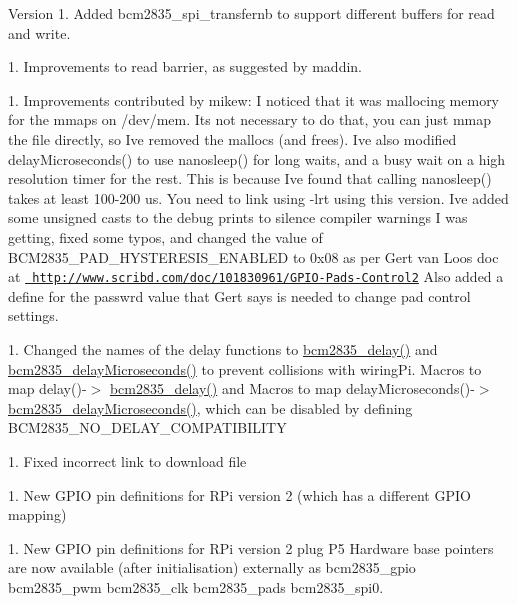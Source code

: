 \begin{DoxyVersion}{Version}
1. Added bcm2835\+\_\+spi\+\_\+transfernb to support different buffers for read and write. 

1. Improvements to read barrier, as suggested by maddin. 

1. Improvements contributed by mikew\+: I noticed that it was mallocing memory for the mmaps on /dev/mem. It\textquotesingle{}s not necessary to do that, you can just mmap the file directly, so I\textquotesingle{}ve removed the mallocs (and frees). I\textquotesingle{}ve also modified delay\+Microseconds() to use nanosleep() for long waits, and a busy wait on a high resolution timer for the rest. This is because I\textquotesingle{}ve found that calling nanosleep() takes at least 100-\/200 us. You need to link using \textquotesingle{}-\/lrt\textquotesingle{} using this version. I\textquotesingle{}ve added some unsigned casts to the debug prints to silence compiler warnings I was getting, fixed some typos, and changed the value of BCM2835\+\_\+\+PAD\+\_\+\+HYSTERESIS\+\_\+\+ENABLED to 0x08 as per Gert van Loo\textquotesingle{}s doc at \href{http://www.scribd.com/doc/101830961/GPIO-Pads-Control2}{\texttt{ http\+://www.\+scribd.\+com/doc/101830961/\+GPIO-\/\+Pads-\/\+Control2}} Also added a define for the passwrd value that Gert says is needed to change pad control settings. 

1. Changed the names of the delay functions to \mbox{\hyperlink{group__gpio_ga3ffbe079732a995cfacd691f677d9789}{bcm2835\+\_\+delay()}} and \mbox{\hyperlink{group__gpio_gade50bd6947463a242783accf91e5b5e4}{bcm2835\+\_\+delay\+Microseconds()}} to prevent collisions with wiring\+Pi. Macros to map delay()-\/\texorpdfstring{$>$}{>} \mbox{\hyperlink{group__gpio_ga3ffbe079732a995cfacd691f677d9789}{bcm2835\+\_\+delay()}} and Macros to map delay\+Microseconds()-\/\texorpdfstring{$>$}{>} \mbox{\hyperlink{group__gpio_gade50bd6947463a242783accf91e5b5e4}{bcm2835\+\_\+delay\+Microseconds()}}, which can be disabled by defining BCM2835\+\_\+\+NO\+\_\+\+DELAY\+\_\+\+COMPATIBILITY 

1. Fixed incorrect link to download file 

1. New GPIO pin definitions for RPi version 2 (which has a different GPIO mapping) ~\newline
 

1. New GPIO pin definitions for RPi version 2 plug P5 Hardware base pointers are now available (after initialisation) externally as bcm2835\+\_\+gpio bcm2835\+\_\+pwm bcm2835\+\_\+clk bcm2835\+\_\+pads bcm2835\+\_\+spi0. 


\end{DoxyVersion}
